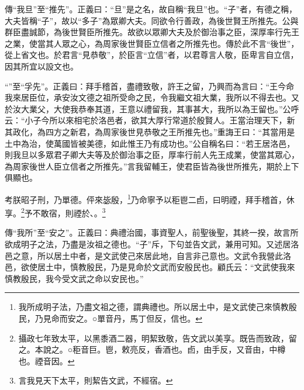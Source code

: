 {\noindent\zhuan{}\fzbyks 傳“我旦”至“推先”。正義曰：“旦”是之名，故自稱“我旦”也。“子”者，有德之稱，大夫皆稱“子”，故以“多子”為眾卿大夫。同欲令行善政，為後世賢王所推先。公與群臣盡誠節，為後世賢臣所推先。故欲以眾卿大夫及於御治事之臣，深厚率行先王之業，使當其人眾之心，為周家後世賢臣立信者之所推先也。傳於此不言“後世”，從上省文也。於君言“見恭敬”，於臣言“立信”者，以君尊言人敬，臣卑言自立信，因其所宜以設文也。 \par}

{\noindent\shu{}\fzkt “”至“孚先”。正義曰：拜手稽首，盡禮致敬，許王之留，乃興而為言曰：“王今命我來居臣位，承安汝文德之祖所受命之民，令我繼文祖大業，我所以不得去也。又於汝大業父，大使我恭奉其道，王意以禮留我，其事甚大，我所以為王留也。”公呼云：“小子今所以來相宅於洛邑者，欲其大厚行常道於殷賢人。王當治理天下，新其政化，為四方之新君，為周家後世見恭敬之王所推先也。”重誨王曰：“其當用是土中為治，使萬國皆被美德，如此惟王乃有成功也。”公自稱名曰：“若王居洛邑，則我旦以多眾君子卿大夫等及於御治事之臣，厚率行前人先王成業，使當其眾心，為周家後世人臣立信者之所推先。”言我留輔王，使君臣皆為後世所推先，期於上下俱顯也。 \par}

考朕昭子刑，乃單德。伻來毖殷，\footnote{我所成明子法，乃盡文祖之德，謂典禮也。所以居土中，是文武使己來慎教殷民，乃見命而安之。○單音丹，馬丁但反，信也。}乃命寧予以秬鬯二卣，曰明禋，拜手稽首，休享。\footnote{攝政七年致太平，以黑黍酒二器，明絜致敬，告文武以美享。既告而致政，留之。本說之。○秬音巨。鬯，敕亮反，香酒也。卣，由手反，又音由，中樽也。禋音因。}予不敢宿，則禋於、。\footnote{言我見天下太平，則絜告文武，不經宿。}


{\noindent\zhuan{}\fzbyks 傳“我所”至“安之”。正義曰：典禮治國，事資聖人，前聖後聖，其終一揆，故言所欲成明子之法，乃盡是汝祖之德也。“子”斥，下句並告文武，兼用可知。又述居洛邑之意，所以居土中者，是文武使己來居此地，自言非己意也。文武令我營此洛邑，欲使居土中，慎教殷民，乃是見命於文武而安殷民也。顧氏云：“文武使我來慎教殷民，我今受文武之命以安民也。” \par}

